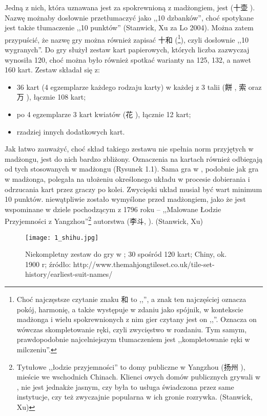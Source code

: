 Jedną z nich, która uznawana jest za spokrewnioną z madżongiem, jest
 (十壶 ). Nazwę możnaby dosłownie przetłumaczyć jako
,,10 dzbanków'', choć spotykane jest także tłumaczenie ,,10 punktów'' (Stanwick,
Xu za Lo 2004). Można zatem przypuścić, że nazwę gry można również zapisać 十和
(\footnote{Choć najczęstsze czytanie znaku 和 to ,,'', a
znak ten najczęściej oznacza pokój, harmonię, a także występuje w zdaniu jako
spójnik, w kontekscie madżonga i wielu spokrewnionych z nim gier czytany jest on
,,''. Oznacza on wówczas skompletowanie ręki, czyli zwycięstwo w
rozdaniu. Tym samym, prawdopodobnie najcelniejszym tłumaczeniem 
jest ,,kompletowanie ręki w milczeniu''.}), czyli dosłownie ,,10 wygranych''. Do
gry służył zestaw kart papierowych, których liczba zazwyczaj wynosiła 120, choć
można było również spotkać warianty na 125, 132, a nawet 160 kart. Zestaw
składał się z:
\begin{itemize}
  \item 36 kart (4 egzemplarze każdego rodzaju karty) w każdej z 3 talii (餅
  , 索  oraz 万 ), łącznie 108 kart;
  \item po 4 egzemplarze 3 kart kwiatów (花 ), łącznie 12 kart;
  \item rzadziej innych dodatkowych kart.
\end{itemize}
Jak łatwo zauważyć, choć skład takiego zestawu nie spełnia norm przyjętych w
madżongu, jest do nich bardzo zbliżony. Oznaczenia na kartach również odbiegają
od tych stosowanych w madżongu (Rysunek 1.1). Sama gra w ,
podobnie jak gra w madżonga, polegała na ułożeniu określonego układu w procesie
dobierania i odrzucania kart przez graczy po kolei. Zwycięski układ musiał być
wart minimum 10 punktów.  niewątpliwie zostało wymyślone przed
madżongiem, jako że jest wspominane w dziele pochodzącym z 1796 roku --
,,Malowane Łodzie Przyjemności z Yangzhou''\footnote{Tytułowe ,,łodzie
przyjemności'' to domy publiczne w Yangzhou (扬州 ), mieście we
wschodnich Chinach. Klienci owych domów publicznych grywali w ,
nie jest jednakże jasnym, czy była to usługa świadczona przez same instytucje,
czy też zwyczajnie popularna w ich gronie rozrywka. (Stanwick, Xu)}
autorstwa  (李斗, ).
(Stanwick, Xu)

\begin{figure}[h]
\centering
\texttt{[image: 1\_shihu.jpg]}
\caption{Niekompletny zestaw do gry w ; 30 spośród 120 kart;
Chiny, ok. 1900 r;  źródło:
http://www.themahjongtileset.co.uk/tile-set-history/earliest-suit-names/}
\end{figure}

